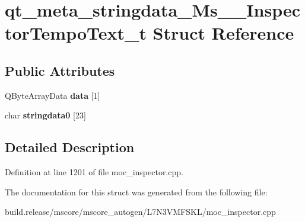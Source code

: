 \hypertarget{structqt__meta__stringdata___ms_____inspector_tempo_text__t}{}\section{qt\+\_\+meta\+\_\+stringdata\+\_\+\+Ms\+\_\+\+\_\+\+Inspector\+Tempo\+Text\+\_\+t Struct Reference}
\label{structqt__meta__stringdata___ms_____inspector_tempo_text__t}
\subsection*{Public Attributes}
\begin{DoxyCompactItemize}
\item 
\mbox{\label{structqt__meta__stringdata___ms_____inspector_tempo_text__t_a6854f57629437d888cb888e7ede411a7}} 
Q\+Byte\+Array\+Data {\bfseries data} \mbox{[}1\mbox{]}
\item 
\mbox{\label{structqt__meta__stringdata___ms_____inspector_tempo_text__t_a3b56ca8ff5f46036f505ecb03baff445}} 
char {\bfseries stringdata0} \mbox{[}23\mbox{]}
\end{DoxyCompactItemize}


\subsection{Detailed Description}


Definition at line 1201 of file moc\+\_\+inspector.\+cpp.



The documentation for this struct was generated from the following file\+:\begin{DoxyCompactItemize}
\item 
build.\+release/mscore/mscore\+\_\+autogen/\+L7\+N3\+V\+M\+F\+S\+K\+L/moc\+\_\+inspector.\+cpp\end{DoxyCompactItemize}
